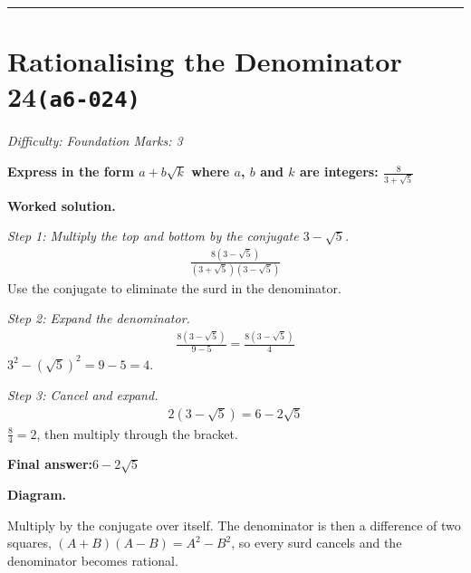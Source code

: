 \documentclass[11pt]{article}
\newcommand{\question}[1]{\par\medskip\noindent\textbf{#1}\par}
\begin{document}
\medskip\hrule

\section*{Rationalising the Denominator 24\quad\small\texttt{(a6-024)}}
\textit{Difficulty: Foundation \quad\textbar\quad Marks: 3}

\question{Express in the form \( a + b\sqrt{k} \) where \( a \), \( b \) and \( k \) are integers: \( \frac{8}{3 + \sqrt{5}} \)}

\textbf{Worked solution.}

\textit{Step 1: Multiply the top and bottom by the conjugate \( 3 - \sqrt{5} \).}
\[\begin{gathered}
\frac{8(3 - \sqrt{5})}{(3 + \sqrt{5})(3 - \sqrt{5})}
\end{gathered}\]
Use the conjugate to eliminate the surd in the denominator.

\textit{Step 2: Expand the denominator.}
\[\begin{gathered}
\frac{8(3 - \sqrt{5})}{9 - 5} = \frac{8(3 - \sqrt{5})}{4}
\end{gathered}\]
\( 3^2 - (\sqrt{5})^2 = 9 - 5 = 4 \).

\textit{Step 3: Cancel and expand.}
\[\begin{gathered}
2(3 - \sqrt{5}) = 6 - 2\sqrt{5}
\end{gathered}\]
\( \frac{8}{4} = 2 \), then multiply through the bracket.

\begin{answerbox}
\textbf{Final answer:}\quad \(\displaystyle 6 - 2\sqrt{5}\)
\end{answerbox}
\textbf{Diagram.}

\begin{center}
\end{center}
\small Multiply by the conjugate over itself. The denominator is then a difference of two squares, $(A+B)(A-B)=A^{2}-B^{2}$, so every surd cancels and the denominator becomes rational.\normalsize
\end{document}
